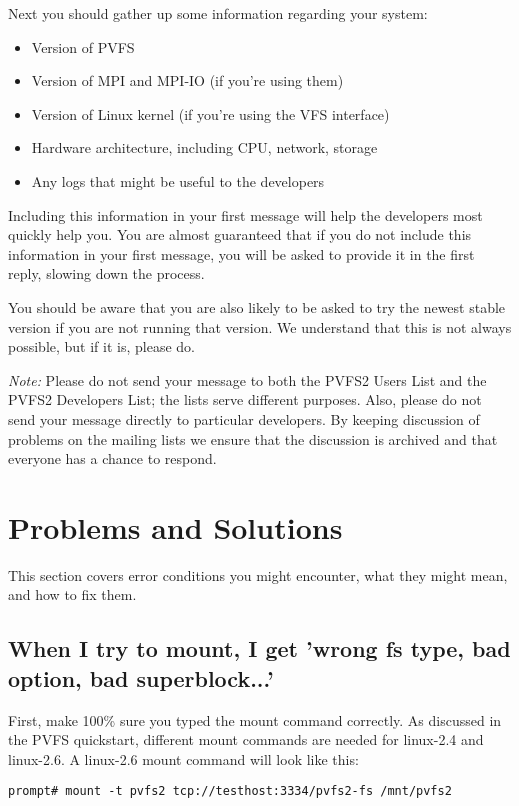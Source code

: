 \documentclass[11pt,letterpaper]{article}
\begin{document}
Next you should gather up some information regarding your system:
\begin{itemize}
\item Version of PVFS
\item Version of MPI and MPI-IO (if you're using them)
\item Version of Linux kernel (if you're using the VFS interface)
\item Hardware architecture, including CPU, network, storage
\item Any logs that might be useful to the developers
\end{itemize}
Including this information in your first message will help the developers most
quickly help you.  You are almost guaranteed that if you do not include this
information in your first message, you will be asked to provide it in the
first reply, slowing down the process.

You should be aware that you are also likely to be asked to try the newest
stable version if you are not running that version.  We understand that this
is not always possible, but if it is, please do.

\emph{Note:} Please do not send your message to both the PVFS2 Users List and
the PVFS2 Developers List; the lists serve different purposes.  Also, please
do not send your message directly to particular developers.  By keeping
discussion of problems on the mailing lists we ensure that the discussion is
archived and that everyone has a chance to respond.

%
%

\section{Problems and Solutions}
This section covers error conditions you might encounter, what they might mean,
and how to fix them.

\subsection{When I try to mount, I get 'wrong fs type, bad option, bad
superblock...'}

First, make 100\% sure you typed the mount command correctly. As discussed in
the PVFS quickstart, different mount commands are needed for linux-2.4 and
linux-2.6.  A linux-2.6 mount command will look like this: 

\begin{verbatim}
prompt# mount -t pvfs2 tcp://testhost:3334/pvfs2-fs /mnt/pvfs2
\end{verbatim}
\end{document}
